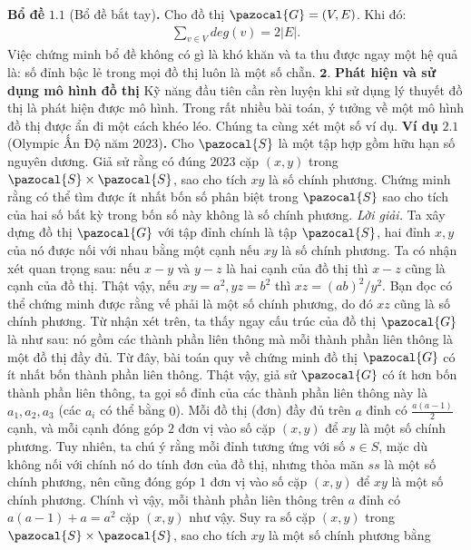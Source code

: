 \begin{multicols}{2}
	\vskip 0.1cm
	\textbf{\color{hoccungpi}Bổ đề} $\pmb{1.1}$ (Bổ đề bắt tay)\textbf{\color{hoccungpi}.}
		Cho đồ thị $\pazocal{G} = (V,E)$. Khi đó:
		\begin{align*}
			\sum\limits_{v \in V} deg(v) = 2 |E|.
		\end{align*}
	Việc chứng minh bổ đề không có gì là khó khăn và ta thu được ngay một hệ quả là: số đỉnh bậc lẻ trong mọi đồ thị luôn là một số chẵn. 
	\vskip 0.1cm
	$\pmb{2.}$ \textbf{\color{hoccungpi}Phát hiện và sử dụng mô hình đồ thị}
	\vskip 0.1cm
	Kỹ năng đầu tiên cần rèn luyện khi sử dụng lý thuyết đồ thị là phát hiện được mô hình. Trong rất nhiều bài toán, ý tưởng về một mô hình đồ thị được ẩn đi một cách khéo léo. Chúng ta cùng xét một số ví dụ.
	\vskip 0.1cm
	\textbf{\color{hoccungpi}Ví dụ} $\pmb{2.1}$ (Olympic Ấn Độ năm $2023$)\textbf{\color{hoccungpi}.} Cho $\pazocal{S}$ là một tập hợp gồm hữu hạn số nguyên dương. Giả sử rằng có đúng $2023$ cặp $(x,y)$ trong $\pazocal{S} \times \pazocal{S}$, sao cho tích $xy$ là số chính phương. Chứng minh rằng có thể tìm được ít nhất bốn số phân biệt trong $\pazocal{S}$ sao cho tích của hai số bất kỳ trong bốn số này không là số chính phương.
	\vskip 0.1cm
	\textit{Lời giải.} Ta xây dựng đồ thị $\pazocal{G}$ với tập đỉnh chính là tập $\pazocal{S}$, hai đỉnh $x,y$ của nó được nối với nhau bằng một cạnh nếu $xy$ là số chính phương. Ta có nhận xét quan trọng sau: nếu $x-y$ và $y-z$ là hai cạnh của đồ thị thì $x-z$ cũng là cạnh của đồ thị. Thật vậy, nếu $xy = a^2, yz = b^2$ thì $xz = (ab)^2 / y^2$. Bạn đọc có thể chứng minh được rằng vế phải là một số chính phương, do đó $xz$ cũng là số chính phương. 
	\vskip 0.1cm
	Từ nhận xét trên, ta thấy ngay cấu trúc của đồ thị $\pazocal{G}$ là như sau: nó gồm các thành phần liên thông mà mỗi thành phần liên thông là một đồ thị đầy đủ. Từ đây, bài toán quy về chứng minh đồ thị $\pazocal{G}$ có ít nhất bốn thành phần liên thông. Thật vậy, giả sử $\pazocal{G}$ có ít hơn bốn thành phần liên thông, ta gọi số đỉnh của các thành phần liên thông này là $a_1, a_2, a_3$ (các $a_i$ có thể bằng $0$). Mỗi đồ thị (đơn) đầy đủ trên $a$ đỉnh có $\frac{a(a-1)}{2}$ cạnh, và mỗi cạnh đóng góp $2$ đơn vị vào  số cặp $(x, y)$ để $xy$ là một số chính phương. Tuy nhiên, ta chú ý rằng mỗi đỉnh tương ứng với số $s\in S$, mặc dù không nối với chính nó do tính đơn của đồ thị, nhưng thỏa mãn $ss$ là một số chính phương, nên cũng đóng góp $1$ đơn vị vào số cặp $(x, y)$ để $xy$ là một số chính phương. Chính vì vậy, mỗi thành phần liên thông trên $a$ đỉnh có $a(a-1)+a=a^2$ cặp $(x,y)$ như vậy. Suy ra số cặp $(x,y)$ trong $\pazocal{S} \times \pazocal{S}$, sao cho tích $xy$ là một số chính phương bằng

\end{multicols}
